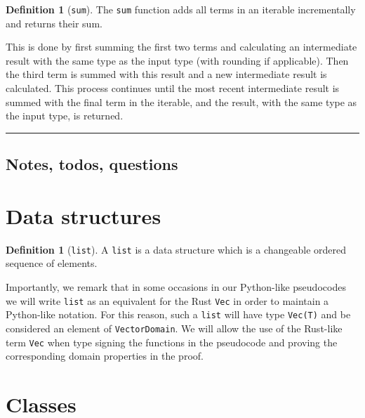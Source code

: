 \documentclass[11pt,a4paper]{article}
\theoremstyle{definition}
\newtheorem{definition}[theorem]{Definition}
\newcommand{\horizline}{\noindent\rule{\textwidth}{1pt}}
\begin{document}
\begin{definition}[\texttt{sum}]
    The \texttt{sum} function adds all terms in an iterable incrementally and returns their sum.
    
    This is done by first summing the first two terms and calculating an intermediate result with the same type as the input type (with rounding if applicable). Then the third term is summed with this result and a new intermediate result is calculated. This process continues until the most recent intermediate result is summed with the final term in the iterable, and the result, with the same type as the input type, is returned.
\end{definition}

\horizline

\subsection{Notes, todos, questions}

\section{Data structures}

\begin{definition}[\texttt{list}]
    A \texttt{list} is a data structure which is a changeable ordered sequence of elements.
\end{definition}

Importantly, we remark that in some occasions in our Python-like pseudocodes we will write \texttt{list} as an equivalent for the Rust \texttt{Vec} in order to maintain a Python-like notation. For this reason, such a \texttt{list} will have type \texttt{Vec(T)} and be considered an element of \texttt{VectorDomain}. We will allow the use of the Rust-like term \texttt{Vec} when type signing the functions in the pseudocode and proving the corresponding domain properties in the proof.

\section{Classes}
\end{document}

